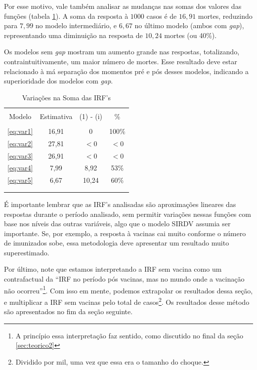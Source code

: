 \documentclass[
    article,
	12pt,				%
	oneside,			%
	a4paper,			%
	english,			%
	brazil,				%
	hyperref = {colorlinks, citecolor=c1d, linkcolor=c2d, urlcolor=c3d, colorlinks}
	]{abntex2}
\begin{document}
Por esse motivo, vale também analisar as mudanças nas somas dos valores das funções (tabela \ref{tb:irfsoma}). A soma da resposta à $1000$ casos é de $16,91$ mortes, reduzindo para $7,99$ no modelo intermediário, e $6,67$ no último modelo (ambos com \textit{gap}), representando uma diminuição na resposta de $10,24$ mortes (ou 40\%).

Os modelos sem \textit{gap} mostram um aumento grande nas respostas, totalizando, contraintuitivamente, um maior número de mortes. Esse resultado deve estar relacionado à má separação dos momentos pré e pós desses modelos, indicando a superioridade dos modelos com \textit{gap}.

\begin{table}[H]
\centering
\caption{Variações na Soma das IRF's}
\label{tb:irfsoma}
\begin{tabular}{cccc}
\\[-1.8ex]\hline 
\hline \\[-1.8ex] 
Modelo & Estimativa & (1) - (i) & \%\\\hline\\[-1.8ex]
\multicolumn{1}{c|}{\eqref{eq:var1}}    & 16,91  & 0     & 100\%\\ 
\multicolumn{1}{c|}{\eqref{eq:var2}}    & 27,81  & $<0$    & $<0$   \\ 
\multicolumn{1}{c|}{\eqref{eq:var3}}    & 26,91  & $<0$    & $<0$   \\
\multicolumn{1}{c|}{\eqref{eq:var4}}    & 7,99   & 8,92  & 53\% \\
\multicolumn{1}{c|}{\eqref{eq:var5}}    & 6,67   & 10,24 & 60\% \\
\\[-1.8ex]\hline 
\hline \\[-1.8ex] 
\end{tabular}
\end{table}

É importante lembrar que as IRF's analisadas são aproximações lineares das respostas durante o período analisado, sem permitir variações nessas funções com base nos níveis das outras variáveis, algo que o modelo SIRDV assumia ser importante. Se, por exemplo, a resposta à vacinas cai muito conforme o número de imunizados sobe, essa metodologia deve apresentar um resultado muito superestimado.

Por último, note que estamos interpretando a IRF sem vacina como um contrafactual da ``IRF no período pós vacinas, mas no mundo onde a vacinação não ocorreu''\footnote{A princípio essa interpretação faz sentido, como discutido no final da seção \ref{sec:teorico2}}. Com isso em mente, podemos extrapolar os resultados dessa seção, e multiplicar a IRF sem vacinas pelo total de casos\footnote{Dividido por mil, uma vez que essa era o tamanho do choque.}. Os resultados desse método são apresentados no fim da seção seguinte.
\end{document}
